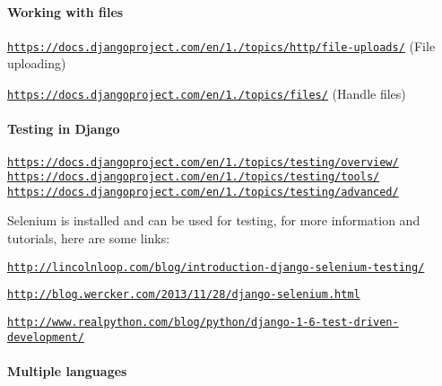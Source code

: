 \paragraph*{Working with files}


\begin{DoxyEnumerate}
\item \href{https://docs.djangoproject.com/en/1.6/topics/http/file-uploads/}{\tt https\-://docs.\-djangoproject.\-com/en/1./topics/http/file-\/uploads/} (File uploading)
\item \href{https://docs.djangoproject.com/en/1.6/topics/files/}{\tt https\-://docs.\-djangoproject.\-com/en/1./topics/files/} (Handle files)
\end{DoxyEnumerate}

\paragraph*{Testing in Django}


\begin{DoxyEnumerate}
\item \href{https://docs.djangoproject.com/en/1.6/topics/testing/overview/}{\tt https\-://docs.\-djangoproject.\-com/en/1./topics/testing/overview/} \href{https://docs.djangoproject.com/en/1.6/topics/testing/tools/}{\tt https\-://docs.\-djangoproject.\-com/en/1./topics/testing/tools/} \href{https://docs.djangoproject.com/en/1.6/topics/testing/advanced/}{\tt https\-://docs.\-djangoproject.\-com/en/1./topics/testing/advanced/}
\end{DoxyEnumerate}

Selenium is installed and can be used for testing, for more information and tutorials, here are some links\-:


\begin{DoxyEnumerate}
\item \href{http://lincolnloop.com/blog/introduction-django-selenium-testing/}{\tt http\-://lincolnloop.\-com/blog/introduction-\/django-\/selenium-\/testing/}
\item \href{http://blog.wercker.com/2013/11/28/django-selenium.html}{\tt http\-://blog.\-wercker.\-com/2013/11/28/django-\/selenium.\-html}
\item \href{http://www.realpython.com/blog/python/django-1-6-test-driven-development/}{\tt http\-://www.\-realpython.\-com/blog/python/django-\/1-\/6-\/test-\/driven-\/development/}
\end{DoxyEnumerate}

\paragraph*{Multiple languages}


